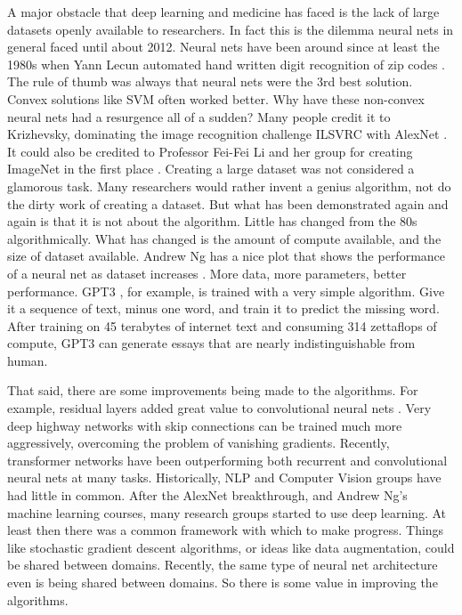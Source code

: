 
A major obstacle that deep learning and medicine has faced is the lack of large datasets openly available to researchers.  In fact this is the dilemma neural nets in general faced until about 2012.  Neural nets have been around since at least the 1980s when Yann Lecun automated hand written digit recognition of zip codes \cite{lecun1989backpropagation}.  The rule of thumb was always that neural nets were the 3rd best solution.  Convex solutions like SVM often worked better.  Why have these non-convex neural nets had a resurgence all of a sudden?  Many people credit it to Krizhevsky, dominating the image recognition challenge ILSVRC with AlexNet \cite{krizhevsky2012imagenet}.  It could also be credited to Professor Fei-Fei Li and her group for creating ImageNet in the first place \cite{deng2009imagenet}.  Creating a large dataset was not considered a glamorous task.  Many researchers would rather invent a genius algorithm, not do the dirty work of creating a dataset.  But what has been demonstrated again and again is that it is not about the algorithm.  Little has changed from the 80s algorithmically.  What has changed is the amount of compute available, and the size of dataset available.  Andrew Ng has a nice plot that shows the performance of a neural net as dataset increases \cite{ng2016nuts}.  More data, more parameters, better performance.  GPT3 \cite{brown2020language}, for example, is trained with a very simple algorithm.  Give it a sequence of text, minus one word, and train it to predict the missing word.  After training on 45 terabytes of internet text and consuming 314 zettaflops of compute, GPT3 can generate essays that are nearly indistinguishable from human.

That said, there are some improvements being made to the algorithms.  For example, residual layers added great value to convolutional neural nets \cite{he2016deep}.  Very deep highway networks with skip connections can be trained much more aggressively, overcoming the problem of vanishing gradients.  Recently, transformer networks have been outperforming both recurrent and convolutional neural nets at many tasks.  Historically, NLP and Computer Vision groups have had little in common.  After the AlexNet breakthrough, and Andrew Ng's machine learning courses, many research groups started to use deep learning.  At least then there was a common framework with which to make progress.  Things like stochastic gradient descent algorithms, or ideas like data augmentation, could be shared between domains.  Recently, the same type of neural net architecture even is being shared between domains.  So there is some value in improving the algorithms.  

